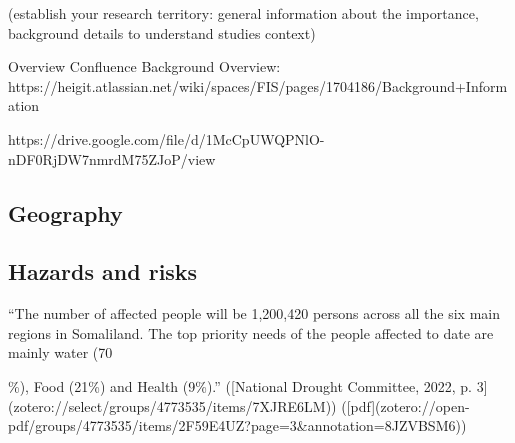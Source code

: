 {(establish your research territory: general information about the importance, background details to understand studies context)

Overview Confluence Background Overview:
https://heigit.atlassian.net/wiki/spaces/FIS/pages/1704186/Background+Information

https://drive.google.com/file/d/1McCpUWQPNlO-nDF0RjDW7nmrdM75ZJoP/view
\subsection{Geography}



\subsection{Hazards and risks}

“The number of affected people will be 1,200,420 persons across all the six main regions in Somaliland. The top priority needs of the people affected to date are mainly water (70{\%), Food (21\%) and Health (9\%).” ([National Drought Committee, 2022, p. 3](zotero://select/groups/4773535/items/7XJRE6LM)) ([pdf](zotero://open-pdf/groups/4773535/items/2F59E4UZ?page=3&annotation=8JZVBSM6))


}}
